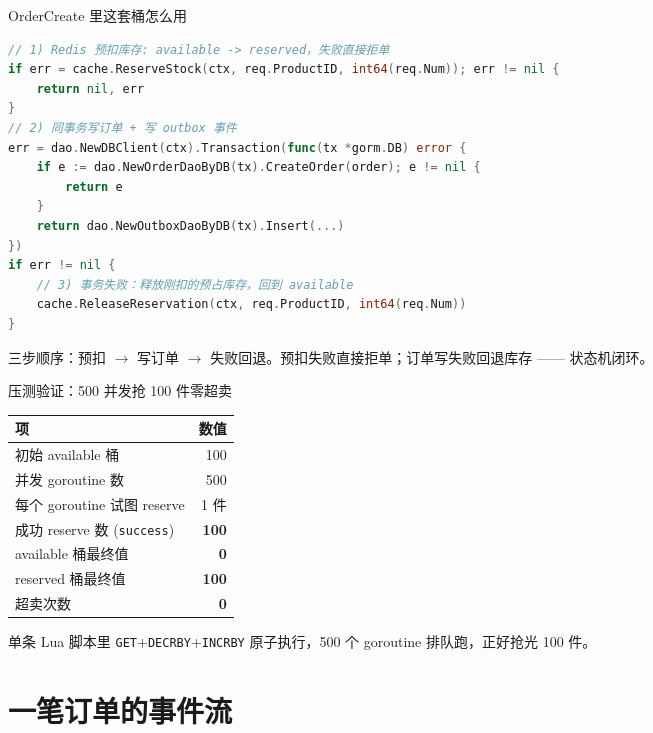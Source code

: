 \begin{frame}[fragile]{OrderCreate 里这套桶怎么用}
\begin{lstlisting}[language=Go,firstnumber=57,
  caption={\srcnote{service/order.go:57--86}}]
// 1) Redis 预扣库存: available -> reserved，失败直接拒单
if err = cache.ReserveStock(ctx, req.ProductID, int64(req.Num)); err != nil {
    return nil, err
}
// 2) 同事务写订单 + 写 outbox 事件
err = dao.NewDBClient(ctx).Transaction(func(tx *gorm.DB) error {
    if e := dao.NewOrderDaoByDB(tx).CreateOrder(order); e != nil {
        return e
    }
    return dao.NewOutboxDaoByDB(tx).Insert(...)
})
if err != nil {
    // 3) 事务失败：释放刚扣的预占库存，回到 available
    cache.ReleaseReservation(ctx, req.ProductID, int64(req.Num))
}
\end{lstlisting}
\small 三步顺序：预扣 $\to$ 写订单 $\to$ 失败回退。预扣失败直接拒单；订单写失败回退库存 —— 状态机闭环。
\end{frame}

\begin{frame}{压测验证：500 并发抢 100 件零超卖}
\begin{tabular}{@{}lr@{}}
\toprule
项 & 数值 \\
\midrule
初始 available 桶 & 100 \\
并发 goroutine 数 & 500 \\
每个 goroutine 试图 reserve & 1 件 \\
\midrule
成功 reserve 数 (\texttt{success}) & \textbf{100} \\
available 桶最终值 & \textbf{0} \\
reserved 桶最终值 & \textbf{100} \\
超卖次数 & \textbf{0} \\
\bottomrule
\end{tabular}
\vspace{2mm}
\small 单条 Lua 脚本里 \texttt{GET}+\texttt{DECRBY}+\texttt{INCRBY} 原子执行，500 个 goroutine 排队跑，正好抢光 100 件。
\end{frame}

\section{一笔订单的事件流}

